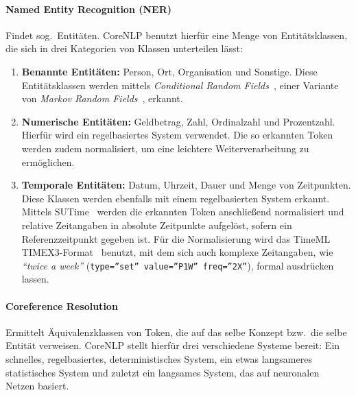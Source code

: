 \paragraph{Named Entity Recognition (NER)}
Findet sog.\ Entitäten.
CoreNLP benutzt hierfür eine Menge von Entitätsklassen, die sich in drei Kategorien von Klassen unterteilen lässt:
\begin{enumerate}
	\item \textbf{Benannte Entitäten:}
		Person, Ort, Organisation und Sonstige.
		Diese Entitätsklassen werden mittels \textit{Conditional Random Fields}~\cite{Finkel2005}, einer Variante von \textit{Markov Random Fields}~, erkannt.
	\item \textbf{Numerische Entitäten:}
		Geldbetrag, Zahl, Ordinalzahl und Prozentzahl.
		Hierfür wird ein regelbasiertes System verwendet.
		Die so erkannten Token werden zudem normalisiert, um eine leichtere Weiterverarbeitung zu ermöglichen.
	\item \textbf{Temporale Entitäten:}
		Datum, Uhrzeit, Dauer und Menge von Zeitpunkten.
		Diese Klassen werden ebenfalls mit einem regelbasierten System erkannt.
		Mittels SUTime~\cite{Chang2012} werden die erkannten Token anschließend normalisiert und relative Zeitangaben in absolute Zeitpunkte aufgelöst, sofern ein Referenzzeitpunkt gegeben ist.
		Für die Normalisierung wird das TimeML TIMEX3-Format~\cite{TIMEX3} benutzt, mit dem sich auch komplexe Zeitangaben, wie \textit{``twice a week''} (\texttt{type=''set'' value=''P1W'' freq=''2X''}), formal ausdrücken lassen.
\end{enumerate}

\paragraph{Coreference Resolution}
Ermittelt Äquivalenzklassen von Token, die auf das selbe Konzept bzw.\ die selbe Entität verweisen.
CoreNLP stellt hierfür drei verschiedene Systeme bereit:
Ein schnelles, regelbasiertes, deterministisches System, ein etwas langsameres statistisches System und zuletzt ein langsames System, das auf neuronalen Netzen basiert.

